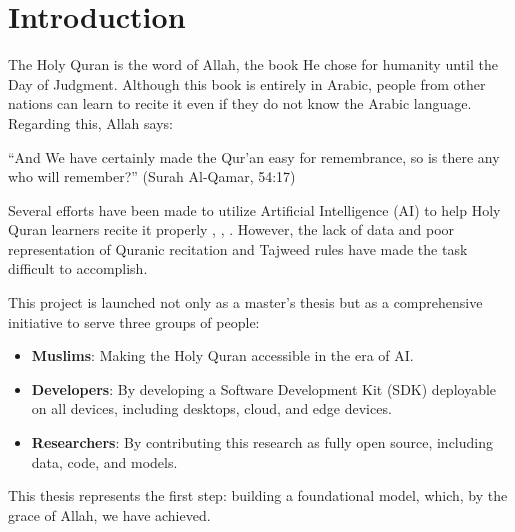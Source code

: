
\chapter{Introduction} %

\label{introduction} %





The Holy Quran is the word of Allah, the book He chose for humanity until the Day of Judgment. Although this book is entirely in Arabic, people from other nations can learn to recite it even if they do not know the Arabic language. Regarding this, Allah says:  

\begin{center}
\end{center}

``And We have certainly made the Qur'an easy for remembrance, so is there any who will remember?'' (Surah Al-Qamar, 54:17)  

Several efforts have been made to utilize Artificial Intelligence (AI) to help Holy Quran learners recite it properly \cite{abdou2014computer}, \cite{al2018computer}, \cite{ahmed2017arabic}. However, the lack of data and poor representation of Quranic recitation and Tajweed rules have made the task difficult to accomplish.

This project is launched not only as a master's thesis but as a comprehensive initiative to serve three groups of people:

\begin{itemize}
\item \textbf{Muslims}: Making the Holy Quran accessible in the era of AI.
\item \textbf{Developers}: By developing a Software Development Kit (SDK) deployable on all devices, including desktops, cloud, and edge devices.
\item \textbf{Researchers}: By contributing this research as fully open source, including data, code, and models.
\end{itemize}

This thesis represents the first step: building a foundational model, which, by the grace of Allah, we have achieved.

